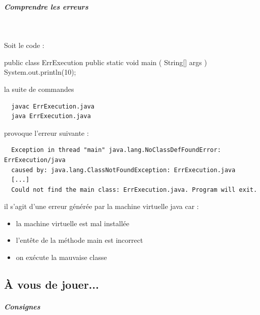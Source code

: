 \documentclass[11pt,a4paper]{article}
\begin{document}
			
		\subparagraph{Comprendre les erreurs} 
		
                \textcolor{white}{.} \par
            
								Soit le code :
							
            \par
        \begin{Java}
  public class ErrExecution {
      public static void main ( String[] args ) {	
          System.out.println(10);
      }
  }							\end{Java}
								la suite de commandes 
							
            \par
        \begin{verbatim}
  javac ErrExecution.java 
  java ErrExecution.java	\end{verbatim}
								provoque l'erreur suivante :
							
            \par
        \begin{verbatim}
  Exception in thread "main" java.lang.NoClassDefFoundError: ErrExecution/java
  caused by: java.lang.ClassNotFoundException: ErrExecution.java
  [...]
  Could not find the main class: ErrExecution.java. Program will exit.	\end{verbatim}
								il s'agit d'une erreur g\'en\'er\'ee par la machine virtuelle java car :
							
            \par
        
            \begin{itemize} 
        
            \item[ \ding{"6D} ] la machine virtuelle est mal install\'ee
        
            \item[ \ding{"6D} ] l'ent\^ete de la m\'ethode main est incorrect
        
            \item[ \ding{"6D} ] on ex\'ecute la mauvaise classe
        
            \end{itemize} 
        \subsection{\`A vous de jouer...}
			
		\subparagraph{Consignes} 
		
\end{document}
